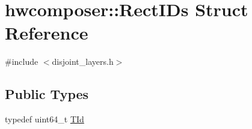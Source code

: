 \hypertarget{structhwcomposer_1_1RectIDs}{}\section{hwcomposer\+:\+:Rect\+I\+Ds Struct Reference}
\label{structhwcomposer_1_1RectIDs}


{\ttfamily \#include $<$disjoint\+\_\+layers.\+h$>$}

\subsection*{Public Types}
\begin{DoxyCompactItemize}
\item 
typedef uint64\+\_\+t \mbox{\hyperlink{structhwcomposer_1_1RectIDs_a53423437c946ca00a75cde5c4d199c6f}{T\+Id}}
\end{DoxyCompactItemize}
